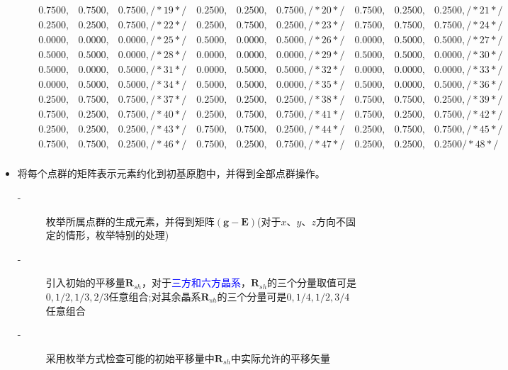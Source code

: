 \begin{itemize}
\begin{enumerate}
\begin{displaymath}
\begin{matrix}
     0.7500, & 0.7500, & 0.7500, /*    19  */\quad 0.2500, & 0.2500, & 0.7500, /*    20  */\quad 0.7500, & 0.2500, & 0.2500, /*    21  */\\
     0.2500, & 0.2500, & 0.7500, /*    22  */\quad 0.2500, & 0.7500, & 0.2500, /*    23  */\quad 0.7500, & 0.7500, & 0.7500, /*    24  */\\
     0.0000, & 0.0000, & 0.0000, /*    25  */\quad 0.5000, & 0.0000, & 0.5000, /*    26  */\quad 0.0000, & 0.5000, & 0.5000, /*    27  */\\
     0.5000, & 0.5000, & 0.0000, /*    28  */\quad 0.0000, & 0.0000, & 0.0000, /*    29  */\quad 0.5000, & 0.5000, & 0.0000, /*    30  */\\
     0.5000, & 0.0000, & 0.5000, /*    31  */\quad 0.0000, & 0.5000, & 0.5000, /*    32  */\quad 0.0000, & 0.0000, & 0.0000, /*    33  */\\
     0.0000, & 0.5000, & 0.5000, /*    34  */\quad 0.5000, & 0.5000, & 0.0000, /*    35  */\quad 0.5000, & 0.0000, & 0.5000, /*    36  */\\
     0.2500, & 0.7500, & 0.7500, /*    37  */\quad 0.2500, & 0.2500, & 0.2500, /*    38  */\quad 0.7500, & 0.7500, & 0.2500, /*    39  */\\
     0.7500, & 0.2500, & 0.7500, /*    40  */\quad 0.2500, & 0.7500, & 0.7500, /*    41  */\quad 0.7500, & 0.2500, & 0.7500, /*    42  */\\
     0.2500, & 0.2500, & 0.2500, /*    43  */\quad 0.7500, & 0.7500, & 0.2500, /*    44  */\quad 0.2500, & 0.7500, & 0.7500, /*    45  */\\
     0.7500, & 0.7500, & 0.2500, /*    46  */\quad 0.7500, & 0.2500, & 0.7500, /*    47  */\quad 0.2500, & 0.2500, & 0.2500  /*    48  */\\
					\end{matrix}
				\end{displaymath}
		\end{enumerate}
	\item 将每个点群的矩阵表示元素约化到初基原胞中，并得到全部点群操作。
		\begin{description}
			\item[-] 枚举所属点群的生成元素，并得到矩阵$(\mathbf{g}-\mathbf{E})$(对于$x$、$y$、$z$方向不固定的情形，枚举特别的处理)
			\item[-] 引入初始的平移量$\mathbf{R}_{sh}$，对于\textcolor{blue}{三方和六方晶系}，$\mathbf{R}_{sh}$的三个分量取值可是$0,1/2,1/3,2/3$任意组合;对其余晶系$\mathbf{R}_{sh}$的三个分量可是$0,1/4,1/2,3/4$任意组合
			\item[-]采用枚举方式检查可能的初始平移量中$\mathbf{R}_{sh}$中实际允许的平移矢量\\

\end{description}
\end{itemize}
